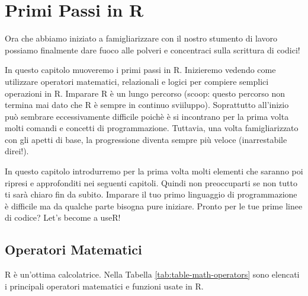 \documentclass[
]{book}
\begin{document}
\hypertarget{first-comands}{%
\chapter{Primi Passi in R}\label{first-comands}}

Ora che abbiamo iniziato a famigliarizzare con il nostro stumento di lavoro possiamo finalmente dare fuoco alle polveri e concentraci sulla scrittura di codici!

In questo capitolo muoveremo i primi passi in R. Inizieremo vedendo come utilizzare operatori matematici, relazionali e logici per compiere semplici operazioni in R. Imparare R è un lungo percorso (scoop: questo percorso non termina mai dato che R è sempre in continuo sviiluppo). Soprattutto all'inizio può sembrare eccessivamente difficile poichè è si incontrano per la prima volta molti comandi e concetti di programmazione. Tuttavia, una volta famigliarizzato con gli apetti di base, la progressione diventa sempre più veloce (inarrestabile direi!).

In questo capitolo introdurremo per la prima volta molti elementi che saranno poi ripresi e approfonditi nei seguenti capitoli. Quindi non preoccuparti se non tutto ti sarà chiaro fin da subito. Imparare il tuo primo linguaggio di programmazione è difficile ma da qualche parte bisogna pure iniziare. Pronto per le tue prime linee di codice? Let's become a useR!

\hypertarget{math-operators}{%
\section{Operatori Matematici}\label{math-operators}}

R è un'ottima calcolatrice. Nella Tabella \ref{tab:table-math-operators} sono elencati i principali operatori matematici e funzioni usate in R.
\end{document}
